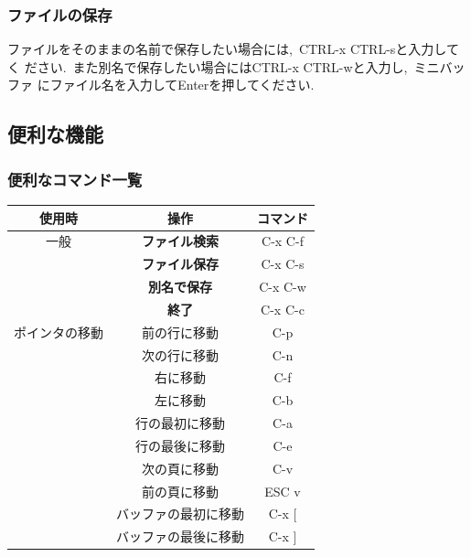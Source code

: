 \documentclass{jarticle}
\begin{document}
\subsubsection{ファイルの保存}
ファイルをそのままの名前で保存したい場合には,\ CTRL-x CTRL-sと入力してく
ださい.\ また別名で保存したい場合にはCTRL-x CTRL-wと入力し,\ ミニバッファ
にファイル名を入力してEnterを押してください.\ 

\subsection{便利な機能} 
\subsubsection{便利なコマンド一覧}

\begin{table}[H]
 \begin{minipage}{0.5\hsize}
  \begin{center}
  \begin{tabular}{|c|c|c|}\hline
  使用時 & 操作  & コマンド \\
  \hline
一般 & {\bf ファイル検索}& C-x C-f  \\
       & {\bf ファイル保存} & C-x C-s  \\
       & {\bf 別名で保存}  & C-x C-w \\
       & {\bf 終了}            & C-x C-c  \\
ポインタの移動 & 前の行に移動    & C-p \\
                      & 次の行に移動    & C-n \\
                      & 右に移動          & C-f  \\
                      & 左に移動          & C-b  \\
                      & 行の最初に移動 & C-a  \\
                      & 行の最後に移動 & C-e  \\
                      & 次の頁に移動    & C-v  \\
                      & 前の頁に移動    & ESC v     \\
                      & バッファの最初に移動 & C-x [ \\
                      & バッファの最後に移動 & C-x ] \\
   \hline
  \end{tabular}
  \end{center}
  \label{table:one}
 \end{minipage}

\end{table}
\end{document}
